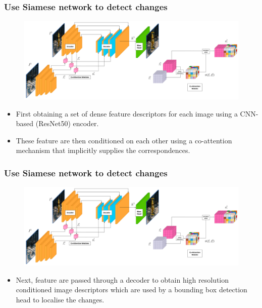 \documentclass[13.5pt,aspecratio=169, xcolor=dvipsnames]{beamer}
\begin{document}
\begin{frame}
    \onehalfspacing
        \frametitle{Use Siamese network to detect changes}
            \begin{figure}[h]
                \centering
                \includegraphics[scale=0.2]{Siamese_network_architecture.png}
            \end{figure}
        
            \begin{itemize}
                \item First obtaining a set of dense feature
                descriptors for each image using a CNN-based (ResNet50) encoder.
                \item These feature are then conditioned on
                each other using a co-attention mechanism that implicitly
                supplies the correspondences.

            \end{itemize}
    \end{frame}


\begin{frame}
    \onehalfspacing
        \frametitle{Use Siamese network to detect changes}
            \begin{figure}[h]
                \centering
                \includegraphics[scale=0.2]{Siamese_network_architecture.png}
            \end{figure}
        
            \begin{itemize}
                \item Next, feature are passed through a decoder to obtain high
                resolution conditioned image descriptors which are used
                by a bounding box detection head to localise the changes.
            \end{itemize}
    \end{frame}
\end{document}
